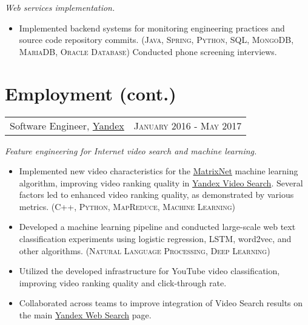 \documentclass{article}
\makeatletter
\newcommand{\whatwherewhen}[3]{
\noindent\begin{tabular*}{\columnwidth}{@{}@{\extracolsep{\fill}}lr@{}}
#1, #2 & \textsc{#3}
\end{tabular*}}
\newcommand{\smallvskip}{\vskip2mm}
\makeatother
\begin{document}
\textit{Web services implementation.}

\begin{itemize}

\item Implemented backend systems for monitoring engineering practices and source code repository commits. (\textsc{Java}, \textsc{Spring}, \textsc{Python}, \textsc{SQL}, \textsc{MongoDB}, \textsc{MariaDB}, \textsc{Oracle Database}) Conducted phone screening interviews.

\end{itemize}


\newpage


\section{Employment (cont.)}


\smallvskip
\whatwherewhen{Software Engineer}{\href{https://yandex.com/company/}{Yandex}}{January 2016 - May 2017}

\textit{Feature engineering for Internet video search and machine learning.}

\begin{itemize}

\item  Implemented new video characteristics for the \href{https://yandex.com/company/technologies/matrixnet/}{MatrixNet} machine learning algorithm, improving video ranking quality in \href{https://yandex.com/video/}{Yandex Video Search}. Several factors led to enhanced video ranking quality, as demonstrated by various metrics. (\textsc{C++}, \textsc{Python}, \textsc{MapReduce}, \textsc{Machine Learning})

\item Developed a machine learning pipeline and conducted large-scale web text classification experiments using logistic regression, LSTM, word2vec, and other algorithms. (\textsc{Natural Language Processing}, \textsc{Deep Learning})

\item Utilized the developed infrastructure for YouTube video classification, improving video ranking quality and click-through rate.

\item Collaborated across teams to improve integration of Video Search results on the main \href{https://yandex.com/}{Yandex Web Search} page.

\end{itemize}
\end{document}
